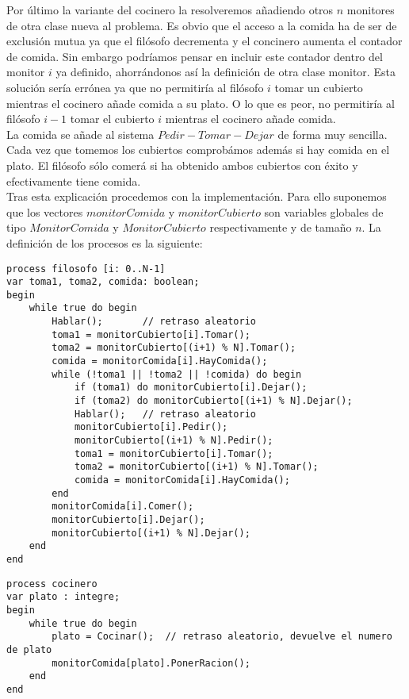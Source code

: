 \documentclass[11pt,a4paper]{article}
\begin{document}
\begin{enumerate}
Por último la variante del cocinero la resolveremos añadiendo otros $n$ monitores de otra clase nueva al problema. Es obvio que el acceso a la comida ha de ser de exclusión mutua ya que el filósofo decrementa y el concinero aumenta el contador de comida. Sin embargo podríamos pensar en incluir este contador dentro del monitor $i$ ya definido, ahorrándonos así la definición de otra clase monitor. Esta solución sería errónea ya que no permitiría al filósofo $i$ tomar un cubierto mientras el cocinero añade comida a su plato. O lo que es peor, no permitiría al filósofo $i-1$ tomar el cubierto $i$ mientras el cocinero añade comida. \\

La comida se añade al sistema $Pedir - Tomar - Dejar$ de forma muy sencilla. Cada vez que tomemos los cubiertos comprobámos además si hay comida en el plato. El filósofo sólo comerá si ha obtenido ambos cubiertos con éxito y efectivamente tiene comida. \\

Tras esta explicación procedemos con la implementación. Para ello suponemos que los vectores $monitorComida$ y $monitorCubierto$ son variables globales de tipo $MonitorComida$ y $MonitorCubierto$ respectivamente y de tamaño $n$. La definición de los procesos es la siguiente:

\begin{lstlisting}
process filosofo [i: 0..N-1]
var toma1, toma2, comida: boolean;
begin
	while true do begin
		Hablar();		// retraso aleatorio
		toma1 = monitorCubierto[i].Tomar();
		toma2 = monitorCubierto[(i+1) % N].Tomar();
		comida = monitorComida[i].HayComida();
		while (!toma1 || !toma2 || !comida) do begin
			if (toma1) do monitorCubierto[i].Dejar();		
			if (toma2) do monitorCubierto[(i+1) % N].Dejar();
			Hablar();	// retraso aleatorio
			monitorCubierto[i].Pedir();
			monitorCubierto[(i+1) % N].Pedir();
			toma1 = monitorCubierto[i].Tomar();
			toma2 = monitorCubierto[(i+1) % N].Tomar();
			comida = monitorComida[i].HayComida();
		end
		monitorComida[i].Comer();
		monitorCubierto[i].Dejar();
		monitorCubierto[(i+1) % N].Dejar();
	end
end
\end{lstlisting}

\begin{lstlisting}
process cocinero 
var plato : integre;
begin
	while true do begin
		plato = Cocinar();	// retraso aleatorio, devuelve el numero de plato
		monitorComida[plato].PonerRacion();
	end
end
\end{lstlisting}


\end{enumerate}
\end{document}
